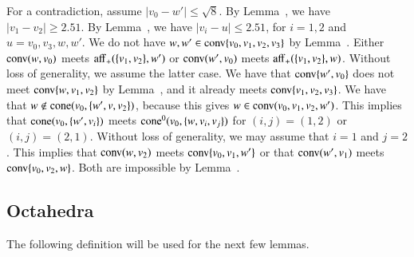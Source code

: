 \begin{tarskidata}
\begin{tarski}
\begin{proved}
For a contradiction, assume $|v_0-w'|\le\sqrt8$.  By
Lemma~, we have $|v_1-v_2|\ge 2.51$.
By Lemma~,\FIXX{$\CalE$}
we have $|v_i-u|\le 2.51$, for
$i=1,2$ and $u=v_0,v_3,w,w'$.  
We do not have $w,w'\in{\operatorname{conv}}\{v_0,v_1,v_2,v_3\}$ by Lemma~.  Either 
${\operatorname{conv}}(w,v_0)$ meets ${\operatorname{aff}}_+(\{v_1,v_2\},w')$ or
${\operatorname{conv}}(w',v_0)$ meets ${\operatorname{aff}}_+(\{v_1,v_2\},w)$.
Without loss of generality, we assume the latter case.
We have that ${\operatorname{conv}}\{w',v_0\}$ does not meet ${\operatorname{conv}}\{w,v_1,v_2\}$
by Lemma~,%
and it already meets ${\operatorname{conv}}\{v_1,v_2,v_3\}$.
We have that $w\not\in{\operatorname{cone}}(v_0,\{w',v,v_2\})$, because this
gives $w\in {\operatorname{conv}}(v_0,v_1,v_2,w')$.  This implies that
${\operatorname{cone}}(v_0,\{w',v_i\})$ meets ${\operatorname{cone}}^0(v_0,\{w,v_i,v_j\})$
for $(i,j)=(1,2)$ or $(i,j)=(2,1)$.  Without loss of generality,
we may assume that $i=1$ and $j=2$.   This implies that
${\operatorname{conv}}(w,v_2)$ meets ${\operatorname{conv}}\{v_0,v_1,w'\}$ or that
${\operatorname{conv}}(w',v_1)$ meets ${\operatorname{conv}}\{v_0,v_2,w\}$.  Both
are impossible by Lemma~.\FIXX{$\CalE$}
%
\swallowed\end{proved}
\end{tarski}















\begin{tarski}
\section{Octahedra}
The following definition will be used for the next few lemmas.


\end{tarski}
\end{tarskidata}
